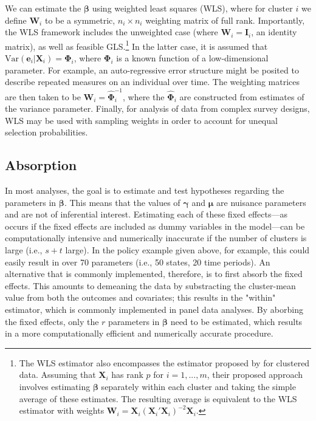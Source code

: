 \documentclass[12pt]{article}\usepackage[]{graphicx}\usepackage[]{color}
\newcommand{\Var}{\text{Var}}
\newcommand{\bm}{\mathbf}
\newcommand{\bs}{\boldsymbol}
\begin{document}
We can estimate the $\bs\beta$ using weighted least squares (WLS), where for cluster $i$ we define $\bm{W}_i$ to be a symmetric, $n_i \times n_i$ weighting matrix of full rank. 
Importantly, the WLS framework includes the unweighted case (where $\bm{W}_i = \bm{I}_i$, an identity matrix), as well as feasible GLS.\footnote{
The WLS estimator also encompasses the estimator proposed by \citet{Ibragimov2010tstatistic} for clustered data. 
Assuming that $\bm{X}_i$ has rank $p$ for $i = 1,...,m$, their proposed approach involves estimating $\bs\beta$ separately within each cluster and taking the simple average of these estimates. 
The resulting average is equivalent to the WLS estimator with weights $\bm{W}_i = \bm{X}_i \left(\bm{X}_i'\bm{X}_i\right)^{-2} \bm{X}_i$.} 
In the latter case, it is assumed that $\Var\left(\bm{e}_i\left|\bm{X}_i\right.\right) = \bs\Phi_i$, where $\bs\Phi_i$ is a known function of a low-dimensional parameter. 
For example, an auto-regressive error structure might be posited to describe repeated measures on an individual over time. 
The weighting matrices are then taken to be $\bm{W}_i = \hat{\bs\Phi}_i^{-1}$, where the $\hat{\bs\Phi}_i$ are constructed from estimates of the variance parameter.
Finally, for analysis of data from complex survey designs, WLS may be used with sampling weights in order to account for unequal selection probabilities.

\subsection{Absorption}

In most analyses, the goal is to estimate and test hypotheses regarding the parameters in $\bs\beta$. 
This means that the values of $\bs\gamma$ and $\bs\mu$ are nuisance parameters and are not of inferential interest. 
Estimating each of these fixed effects---as occurs if the fixed effects are included as dummy variables in the model---can be computationally intensive and numerically inaccurate if the number of clusters is large (i.e., $s + t$ large). 
In the policy example given above, for example, this could easily result in over 70 parameters (i.e., 50 states, 20 time periods).
An alternative that is commonly implemented, therefore, is to first absorb the fixed effects. 
This amounts to demeaning the data by substracting the cluster-mean value from both the outcomes and covariates; this results in the "within" estimator, which is commonly implemented in panel data analyses. 
By aborbing the fixed effects, only the $r$ parameters in $\bs\beta$ need to be estimated, which results in a more computationally efficient and numerically accurate procedure. 
\end{document}
